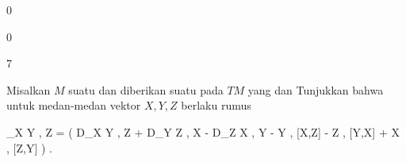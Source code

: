 {0}

{

}
{  }



{0}

{

}
{  }



{7}

{

Misalkan $M$ suatu
dan diberikan suatu
pada
$TM$ yang
dan
Tunjukkan bahwa untuk medan-medan vektor $X,Y,Z$ berlaku rumus

\mavergleichskettedisp
{\vergleichskette
{ \left\langle \nabla_X Y , Z  \right\rangle
}
{ =} { {  }  \left(  D_X \left\langle  Y  ,  Z  \right\rangle +  D_Y \left\langle  Z  ,  X  \right\rangle -  D_Z \left\langle  X  ,  Y  \right\rangle  - \left\langle  Y  , [X,Z]   \right\rangle - \left\langle  Z  , [Y,X]   \right\rangle + \left\langle  X  , [Z,Y]   \right\rangle   \right)
}
{ } {
}
{ } {
}
{ } {
}
}
{}{}{.}

}
